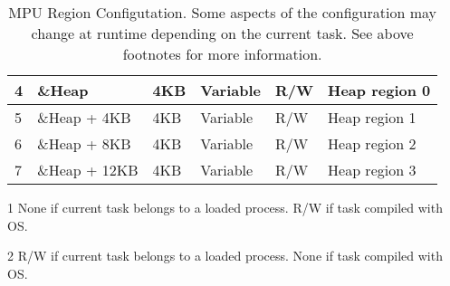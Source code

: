 \begin{table}[H]
\begin{minipage}{10cm}
\begin{threeparttable}[t]
\begin{tabular}{|l|l|l|l|l|l|}
    4                 & \&Heap                                              & 4KB                                                 & Variable\tnote{2}                          & R/W                                      & Heap region 0                                                                                                  \\ \hline
    5                 & \&Heap + 4KB                                        & 4KB                                                 & Variable\tnote{2}                          & R/W                                      & Heap region 1                                                                                                  \\ \hline
    6                 & \&Heap + 8KB                                        & 4KB                                                 & Variable\tnote{2}                          & R/W                                      & Heap region 2                                                                                                  \\ \hline
    7                 & \&Heap + 12KB                                       & 4KB                                                 & Variable\tnote{2}                          & R/W                                      & Heap region 3                                                                                                  \\ \hline
    \end{tabular}
    \begin{tablenotes}
        \item[1] None if current task belongs to a loaded process. R/W if task compiled with OS.
        \item[2] R/W if current task belongs to a loaded process. None if task compiled with OS.
   \end{tablenotes}
\end{threeparttable}
\end{minipage}
    \caption{MPU Region Configutation. Some aspects of the configuration
    may change at runtime depending on the current task. See above footnotes
    for more information.}
    \label{table:mpu_cfg}
\end{table}

